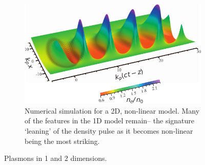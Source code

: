 \documentclass[12pt,letter]{article}
\begin{document}
\begin{figure}[h!]
\begin{singlespace*}
        \begin{subfigure}[t]{\textwidth}
            \includegraphics[height = .3\textheight]{../figures/esarey3dnonlin.pdf}

            \caption{\small  Numerical simulation for a 2D, non-linear model. Many of the
                features in the 1D model remain-- the signature `leaning' of the density
                pulse as it becomes non-linear being the most
            striking.\cite{RevModPhys.81.1229} }
            \label{fig:plasmon2}
        \end{subfigure}
        \caption{\small Plasmons in 1 and 2 dimensions.}
\end{singlespace*}
    \end{figure}
\end{document}
